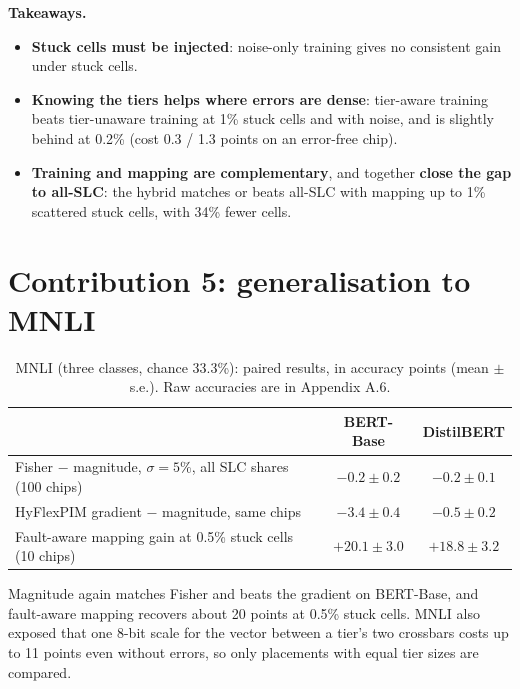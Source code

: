 \documentclass[10pt,a4paper]{article}
\begin{document}
\noindent\textbf{Takeaways.}
\begin{itemize}
\item \textbf{Stuck cells must be injected}: noise-only training gives no consistent gain under stuck cells.
\item \textbf{Knowing the tiers helps where errors are dense}: tier-aware training beats tier-unaware training at
1\% stuck cells and with noise, and is slightly behind at 0.2\% (cost 0.3 / 1.3 points on an error-free chip).
\item \textbf{Training and mapping are complementary}, and together \textbf{close the gap to all-SLC}: the hybrid
matches or beats all-SLC with mapping up to 1\% scattered stuck cells, with 34\% fewer cells.
\end{itemize}

\section{Contribution 5: generalisation to MNLI}
\begin{table}[H]
\centering\small
\caption{MNLI (three classes, chance 33.3\%): paired results, in accuracy points (mean $\pm$ s.e.). Raw
accuracies are in Appendix A.6.}\label{t:mnli}
\begin{tabular}{@{}lcc@{}}
\toprule
& BERT-Base & DistilBERT \\
\midrule
Fisher $-$ magnitude, $\sigma=5\%$, all SLC shares (100 chips) & $-0.2\pm0.2$ & $-0.2\pm0.1$ \\
HyFlexPIM gradient $-$ magnitude, same chips & $-3.4\pm0.4$ & $-0.5\pm0.2$ \\
Fault-aware mapping gain at 0.5\% stuck cells (10 chips) & $+20.1\pm3.0$ & $+18.8\pm3.2$ \\
\bottomrule
\end{tabular}
\end{table}

\noindent Magnitude again matches Fisher and beats the gradient on BERT-Base, and fault-aware mapping recovers
about 20 points at 0.5\% stuck cells. MNLI also exposed that one 8-bit scale for the vector between a tier's
two crossbars costs up to 11 points even without errors, so only placements with equal tier sizes are compared.
\end{document}
